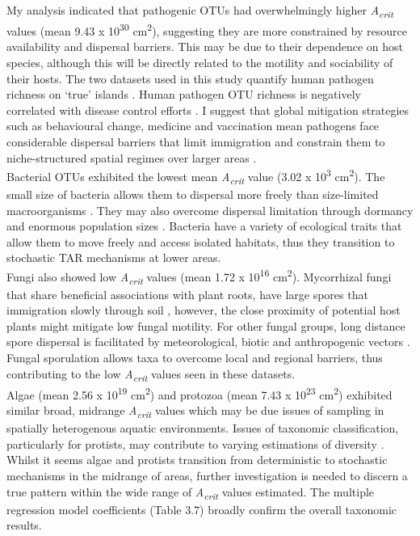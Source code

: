 \noindent My analysis indicated that pathogenic OTUs had overwhelmingly higher \textit{A\textsubscript{crit}} values (mean 9.43 x 10\textsuperscript{30} cm\textsuperscript{2}), suggesting they are more constrained by resource availability and dispersal barriers. This may be due to their dependence on host species, although this will be directly related to the motility and sociability of their hosts. The two datasets used in this study quantify human pathogen richness on `true' islands \cite{jean2016equilibrium}. Human pathogen OTU richness is negatively correlated with disease control efforts \cite{dunn2010global}. I suggest that global mitigation strategies such as behavioural change, medicine and vaccination mean pathogens face considerable dispersal barriers that limit immigration and constrain them to niche-structured spatial regimes over larger areas  \cite{nicolaides2020hand} . \\

\noindent Bacterial OTUs exhibited the lowest mean \textit{A\textsubscript{crit}} value (3.02 x 10\textsuperscript{3} cm\textsuperscript{2}). The small size of bacteria allows them to dispersal more freely than size-limited macroorganisms \cite{martiny2006microbial}. They may also overcome dispersal limitation through dormancy and enormous population sizes \cite{LoceyKennethJ2010Stbw} \cite{fenchel2004ubiquity}. Bacteria have a variety of ecological traits that allow them to move freely and access isolated habitats, thus they transition to stochastic TAR mechanisms at lower areas. \\
 
\noindent Fungi also showed low \textit{A\textsubscript{crit}} values (mean 1.72 x 10\textsuperscript{16} cm\textsuperscript{2}). Mycorrhizal fungi that share beneficial associations with plant roots, have large spores that immigration slowly through soil \cite{bueno2019arbuscular}, however, the close proximity of potential host plants might mitigate low fungal motility. For other fungal groups, long distance spore dispersal is facilitated by meteorological, biotic and anthropogenic vectors \cite{golan2017long}. Fungal sporulation allows taxa to overcome local and regional barriers, thus contributing to the low \textit{A\textsubscript{crit}} values seen in these datasets. \\

\noindent Algae (mean 2.56 x 10\textsuperscript{19} cm\textsuperscript{2}) and protozoa (mean 7.43 x 10\textsuperscript{23} cm\textsuperscript{2}) exhibited similar broad, midrange \textit{A\textsubscript{crit}} values which may be due issues of sampling in spatially heterogenous aquatic environments. Issues of taxonomic classification, particularly for protists, may contribute to varying estimations of diversity \cite{foissner2006biogeography}. Whilst it seems algae and protists transition from deterministic to stochastic mechanisms in the midrange of areas, further investigation is needed to discern a true pattern within the wide range of \textit{A\textsubscript{crit}} values estimated. The multiple regression model coefficients (Table 3.7) broadly confirm the overall taxonomic results. \\

